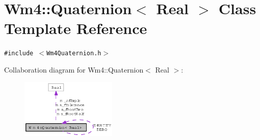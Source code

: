 \section{Wm4::Quaternion$<$ Real $>$ Class Template Reference}
\label{classWm4_1_1Quaternion}
{\tt \#include $<$Wm4Quaternion.h$>$}

Collaboration diagram for Wm4::Quaternion$<$ Real $>$:\begin{figure}[H]
\begin{center}
\leavevmode
\includegraphics[width=129pt]{classWm4_1_1Quaternion__coll__graph}
\end{center}
\end{figure}
